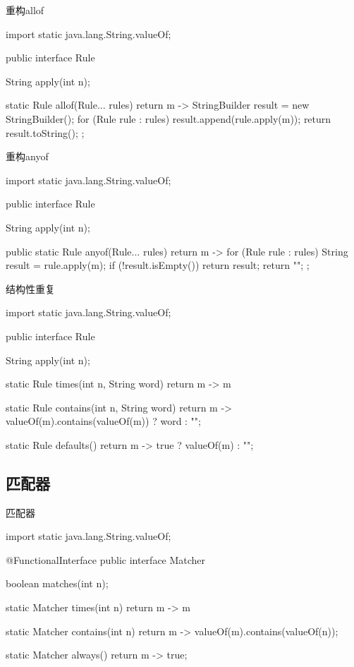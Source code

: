 \begin{frame}[fragile]{重构allof}
  \begin{java}
import static java.lang.String.valueOf;

public interface Rule {
  String apply(int n);

  static Rule allof(Rule... rules) {
    return m -> {
      StringBuilder result = new StringBuilder();
      for (Rule rule : rules) {
        result.append(rule.apply(m));
      }
      return result.toString();
    };
  }
}
  \end{java}
\end{frame}

\begin{frame}[fragile]{重构anyof}
  \begin{java}
import static java.lang.String.valueOf;

public interface Rule {
  String apply(int n);

  public static Rule anyof(Rule... rules) {
    return m -> {
      for (Rule rule : rules) {
        String result = rule.apply(m);
        if (!result.isEmpty())
          return result;
      }
      return "";
    };
  }
}
  \end{java}
\end{frame}

\begin{frame}[fragile]{结构性重复}
  \begin{java}
import static java.lang.String.valueOf;

public interface Rule {
  String apply(int n);

  static Rule times(int n, String word) {
    return m -> m %
  }

  static Rule contains(int n, String word) {
    return m -> valueOf(m).contains(valueOf(m)) ? word : "";
  }

  static Rule defaults() {
    return m -> true ? valueOf(m) : "";
  }  
}
  \end{java}
\end{frame}

\subsection{匹配器}

\begin{frame}[fragile]{匹配器}
  \begin{java}
import static java.lang.String.valueOf;

@FunctionalInterface
public interface Matcher {
  boolean matches(int n);

  static Matcher times(int n) {
    return m -> m %
  }

  static Matcher contains(int n) {
    return m -> valueOf(m).contains(valueOf(n));
  }

  static Matcher always() {
    return m -> true;
  }
}
  \end{java}
\end{frame}

